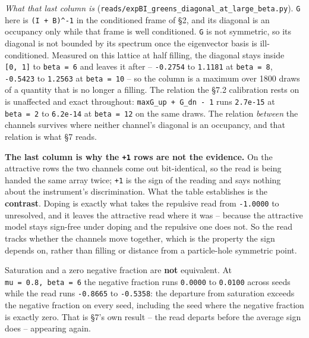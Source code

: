 \documentclass[10pt,letterpaper,twocolumn]{article}
\begin{document}
\emph{What that last column is} (\texttt{reads/\allowbreak{}expBI\_\allowbreak{}greens\_\allowbreak{}diagonal\_\allowbreak{}at\_\allowbreak{}large\_\allowbreak{}beta.\allowbreak{}py}). \texttt{G} here is
\texttt{(\allowbreak{}I\ +\allowbreak{}\ B)\allowbreak{}\^{}-{}\allowbreak{}1} in the conditioned frame of §2, and its diagonal is an occupancy only while that frame
is well conditioned. \texttt{G} is not symmetric, so its diagonal is not bounded by its spectrum once the
eigenvector basis is ill-conditioned. Measured on this lattice at half filling, the diagonal stays
inside \texttt{[\allowbreak{}0,\allowbreak{}\ 1]\allowbreak{}} to \texttt{beta\ =\allowbreak{}\ 6} and leaves it after -- \texttt{-{}\allowbreak{}0.\allowbreak{}2754} to \texttt{1.\allowbreak{}1181} at \texttt{beta\ =\allowbreak{}\ 8}, \texttt{-{}\allowbreak{}0.\allowbreak{}5423}
to \texttt{1.\allowbreak{}2563} at \texttt{beta\ =\allowbreak{}\ 10} -- so the column is a maximum over 1800 draws of a quantity that is no
longer a filling. The relation the §7.2 calibration rests on is unaffected and exact throughout:
\texttt{max\textbar{}\allowbreak{}G\_\allowbreak{}up\ +\allowbreak{}\ G\_\allowbreak{}dn\ -{}\allowbreak{}\ 1\textbar{}\allowbreak{}} runs \texttt{2.\allowbreak{}7e-{}\allowbreak{}15} at \texttt{beta\ =\allowbreak{}\ 2} to \texttt{6.\allowbreak{}2e-{}\allowbreak{}14} at \texttt{beta\ =\allowbreak{}\ 12} on the same draws.
The relation \emph{between} the channels survives where neither channel's diagonal is an occupancy, and
that relation is what §7 reads.

\textbf{The last column is why the \texttt{+\allowbreak{}1} rows are not the evidence.} On the attractive rows the two
channels come out bit-identical, so the read is being handed the same array twice; \texttt{+\allowbreak{}1} is the
sign of the reading and says nothing about the instrument's discrimination. What the table
establishes is the \textbf{contrast}. Doping is exactly what takes the repulsive read from \texttt{-{}\allowbreak{}1.\allowbreak{}0000} to
unresolved, and it leaves the attractive read where it was -- because the attractive model stays
sign-free under doping and the repulsive one does not. So the read tracks whether the channels move
together, which is the property the sign depends on, rather than filling or distance from a
particle-hole symmetric point.

Saturation and a zero negative fraction are \textbf{not} equivalent. At \texttt{mu\ =\allowbreak{}\ 0.\allowbreak{}8,\allowbreak{}\ beta\ =\allowbreak{}\ 6} the
negative fraction runs \texttt{0.\allowbreak{}0000} to \texttt{0.\allowbreak{}0100} across seeds while the read runs \texttt{-{}\allowbreak{}0.\allowbreak{}8665} to
\texttt{-{}\allowbreak{}0.\allowbreak{}5358}: the departure from saturation exceeds the negative fraction on every seed, including
the seed where the negative fraction is exactly zero. That is §7's own result -- the read departs
before the average sign does -- appearing again.
\end{document}

